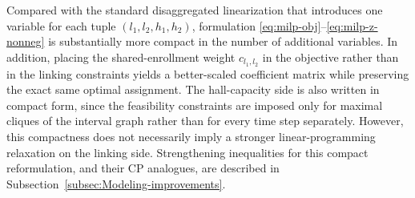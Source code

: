 \documentclass[11pt]{article}
\begin{document}
Compared with the standard disaggregated linearization that introduces one variable for each tuple $(l_1,l_2,h_1,h_2)$, formulation \eqref{eq:milp-obj}--\eqref{eq:milp-z-nonneg} is substantially more compact in the number of additional variables. In addition, placing the shared-enrollment weight $c_{l_1,l_2}$ in the objective rather than in the linking constraints yields a better-scaled coefficient matrix while preserving the exact same optimal assignment. The hall-capacity side is also written in compact form, since the feasibility constraints are imposed only for maximal cliques of the interval graph rather than for every time step separately. However, this compactness does not necessarily imply a stronger linear-programming relaxation on the linking side.
Strengthening inequalities for this compact reformulation, and their CP analogues, are described in Subsection~\ref{subsec:Modeling-improvements}.
\end{document}
